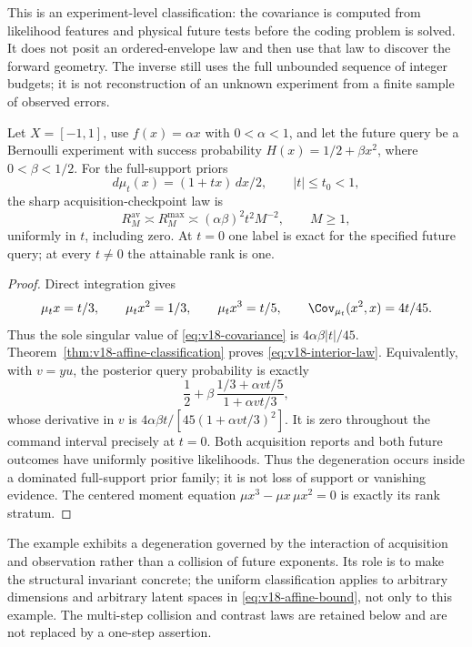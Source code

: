 This is an experiment-level classification: the covariance is computed
from likelihood features and physical future tests before the coding
problem is solved. It does not posit an ordered-envelope law and then
use that law to discover the forward geometry. The inverse still uses
the full unbounded sequence of integer budgets; it is not reconstruction
of an unknown experiment from a finite sample of observed errors.

\begin{proposition}
\label{prop:v18-interior-example}
Let $X=[-1,1]$, use $f(x)=\alpha x$ with $0<\alpha<1$, and let the
future query be a Bernoulli experiment with success probability
$H(x)=1/2+\beta x^2$, where $0<\beta<1/2$. For the full-support priors
\[
 d\mu_t(x)=(1+tx)\,dx/2,\qquad |t|\le t_0<1,
\]
the sharp acquisition-checkpoint law is
\begin{equation}\label{eq:v18-interior-law}
 R^{\mathrm{av}}_M\asymp R^{\mathrm{max}}_M
 \asymp (\alpha\beta)^2t^2M^{-2},\qquad M\ge1,
\end{equation}
uniformly in $t$, including zero. At $t=0$ one label is exact for the
specified future query; at every $t\ne0$ the attainable rank is one.
\end{proposition}
\begin{proof}
Direct integration gives
\[
 \mu_tx=t/3,\qquad \mu_tx^2=1/3,\qquad \mu_tx^3=t/5,
 \qquad \Cov_{\mu_t}(x^2,x)=4t/45.
\]
Thus the sole singular value of \eqref{eq:v18-covariance} is
$4\alpha\beta|t|/45$. Theorem~\ref{thm:v18-affine-classification}
proves \eqref{eq:v18-interior-law}. Equivalently, with $v=yu$, the
posterior query probability is exactly
\[
 \frac12+\beta\,
 \frac{1/3+\alpha vt/5}{1+\alpha vt/3},
\]
whose derivative in $v$ is
$4\alpha\beta t/[45(1+\alpha vt/3)^2]$.
It is zero throughout the command interval precisely at $t=0$.
Both acquisition reports and both future outcomes have uniformly
positive likelihoods. Thus the degeneration occurs inside a dominated
full-support prior family; it is not loss of support or vanishing
evidence. The centered moment equation $\mu x^3-\mu x\,\mu x^2=0$
is exactly its rank stratum.
\end{proof}

The example exhibits a degeneration governed by the interaction of
acquisition and observation rather than a collision of future exponents.
Its role is to make the structural invariant concrete; the uniform
classification applies to arbitrary dimensions and arbitrary latent
spaces in \eqref{eq:v18-affine-bound}, not only to this example. The
multi-step collision and contrast laws are retained below and are not
replaced by a one-step assertion.
